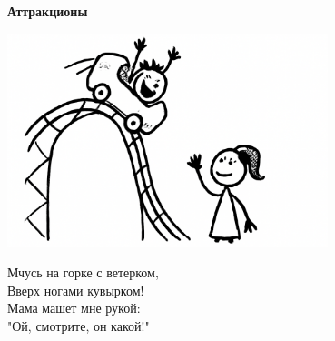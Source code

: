 \vspace*{\fill}
\begin{center}
  {\huge\textbf{Аттракционы}}

  \vspace{1.5em}
  \includegraphics[width=0.7\textwidth]{pictures/attrakcioni.png}
  \vspace{4em}
  \parbox{0.6\textwidth}{
    \LARGE
    \begin{spacing}{1.2}
      Мчусь на горке с ветерком,\\
      Вверх ногами кувырком!\\
      Мама машет мне рукой:\\
      "Ой, смотрите, он какой!" %
    \end{spacing}
      
  }
\end{center}
\vspace*{\fill}